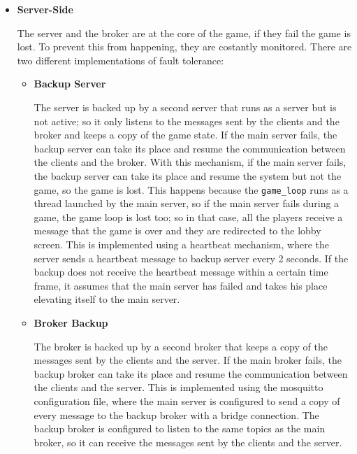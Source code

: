\documentclass{scrartcl}
\begin{document}
\begin{itemize}
    \item
          \textbf{Server-Side} \par
          The server and the broker are at the core of the game, if they fail the game is lost. \newline
          To prevent this from happening, they are costantly monitored.
          There are two different implementations of fault tolerance:
          \begin{itemize}
              \item \textbf{Backup Server} \par
                    The server is backed up by a second server that runs as a server but is not active; so it only listens to the messages sent by the clients and the broker and keeps a copy of the game state. \newline
                    If the main server fails, the backup server can take its place and resume the communication between the clients and the broker. With this mechanism, if the main server fails, the backup server can take its place and resume the system but not the game, so the game is lost.
                    This happens because the \texttt{game\_loop} runs as a thread launched by the main server, so if the main server fails during a game, the game loop is lost too; so in that case, all the players receive a message that the game is over and they are redirected to the lobby screen. \newline
                    This is implemented using a heartbeat mechanism, where the server sends a heartbeat message to backup server every 2 seconds. If the backup does not receive the heartbeat message within a certain time frame, it assumes that the main server has failed and takes his place elevating itself to the main server. \newline
              \item \textbf{Broker Backup} \par
                    The broker is backed up by a second broker that keeps a copy of the messages sent by the clients and the server.
                    If the main broker fails, the backup broker can take its place and resume the communication between the clients and the server.
                    This is implemented using the mosquitto configuration file, where the main server is configured to send a copy of every message to the backup broker with a bridge connection. \newline
                    The backup broker is configured to listen to the same topics as the main broker, so it can receive the messages sent by the clients and the server. \newline

\end{itemize}
\end{itemize}
\end{document}
